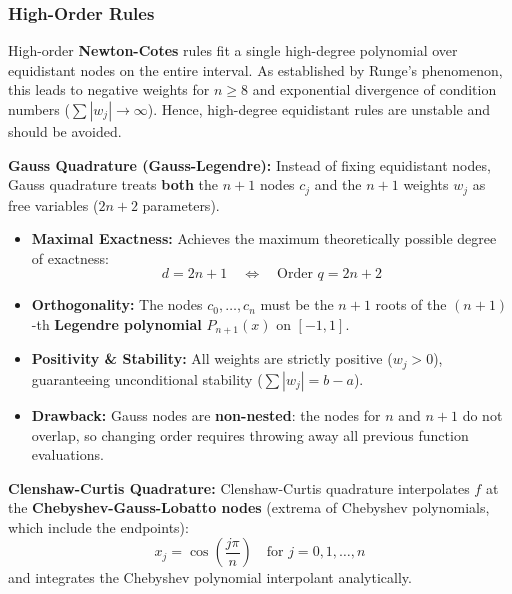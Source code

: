 \subsubsection{High-Order Rules}

\begin{remark}
    High-order \textbf{Newton-Cotes} rules fit a single high-degree polynomial over equidistant nodes on the entire interval. As established by Runge's phenomenon, this leads to negative weights for $n \ge 8$ and exponential divergence of condition numbers ($\sum |w_j| \to \infty$). Hence, high-degree equidistant rules are unstable and should be avoided.
\end{remark}

\begin{definition}
    \textbf{Gauss Quadrature (Gauss-Legendre):} Instead of fixing equidistant nodes, Gauss quadrature treats \textbf{both} the $n+1$ nodes $c_j$ and the $n+1$ weights $w_j$ as free variables ($2n+2$ parameters).
    \begin{itemize}
        \item \textbf{Maximal Exactness:} Achieves the maximum theoretically possible degree of exactness:
        $$d = 2n + 1 \quad \iff \quad \text{Order } q = 2n + 2$$
        \item \textbf{Orthogonality:} The nodes $c_0, \dots, c_n$ must be the $n+1$ roots of the $(n+1)$-th \textbf{Legendre polynomial} $P_{n+1}(x)$ on $[-1, 1]$.
        \item \textbf{Positivity \& Stability:} All weights are strictly positive ($w_j > 0$), guaranteeing unconditional stability ($\sum |w_j| = b-a$).
        \item \textbf{Drawback:} Gauss nodes are \textbf{non-nested}: the nodes for $n$ and $n+1$ do not overlap, so changing order requires throwing away all previous function evaluations.
    \end{itemize}
\end{definition}

\begin{definition}
    \textbf{Clenshaw-Curtis Quadrature:} Clenshaw-Curtis quadrature interpolates $f$ at the \textbf{Chebyshev-Gauss-Lobatto nodes} (extrema of Chebyshev polynomials, which include the endpoints):
    $$x_j = \cos\left(\frac{j\pi}{n}\right) \quad \text{for } j = 0, 1, \dots, n$$
    and integrates the Chebyshev polynomial interpolant analytically.
\end{definition}

